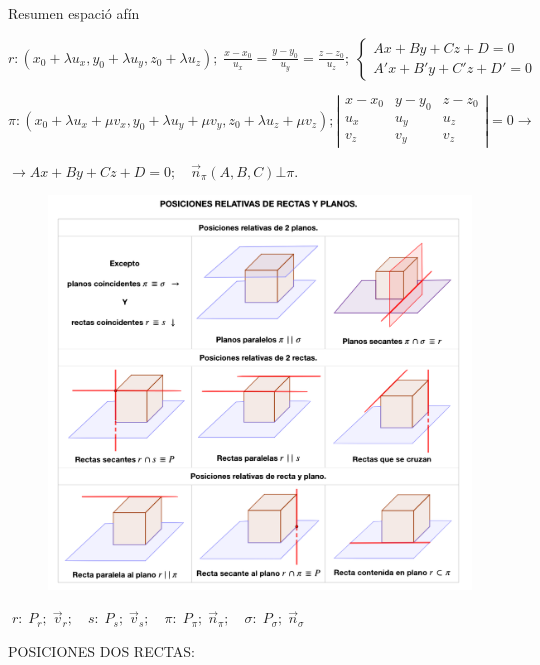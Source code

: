 \begin{myalertblock}{Resumen espació afín}

\tiny{$r:(x_0+\lambda u_x, y_0+\lambda u_y, z_0+\lambda u_z);\; \frac{x-x_0}{u_x}=\frac{y-y_0}{u_y }=\frac{z-z_0}{u_z}; \; \begin{cases} Ax+By+Cz+D=0\\A'x+B'y+C'z+D'=0 \end{cases}$}

\tiny{$\pi: (x_0+\lambda u_x+\mu v_x, y_0+\lambda u_y+\mu v_y, z_0+\lambda u_z+\mu v_z) ; \left| \begin{matrix} x-x_0&y-y_0&z-z_0\\u_x&u_y&u_z\\v_z&v_y&v_z  \end{matrix} \right|=0\to$}

\tiny{$\to Ax+By+Cz+D=0; \quad \vec n_{\pi}(A,B,C) \bot \pi$}\normalsize{.}

	\begin{figure}[H]
		\centering
		\includegraphics[width=1\textwidth]{imagenes/imagenes10/T10IM99T.png}
 	\end{figure}
 	

\centerline{$\boxed{\;r:\; P_r;\; \vec v_r; \quad 
s:\; P_s;\; \vec v_s; \quad 
\pi:\; P_{\pi};\; \vec n_{\pi}; \quad
\sigma:\; P_{\sigma};\; \vec n_{\sigma}\;}$}

\vspace{2mm} POSICIONES DOS RECTAS:	


\end{myalertblock}
